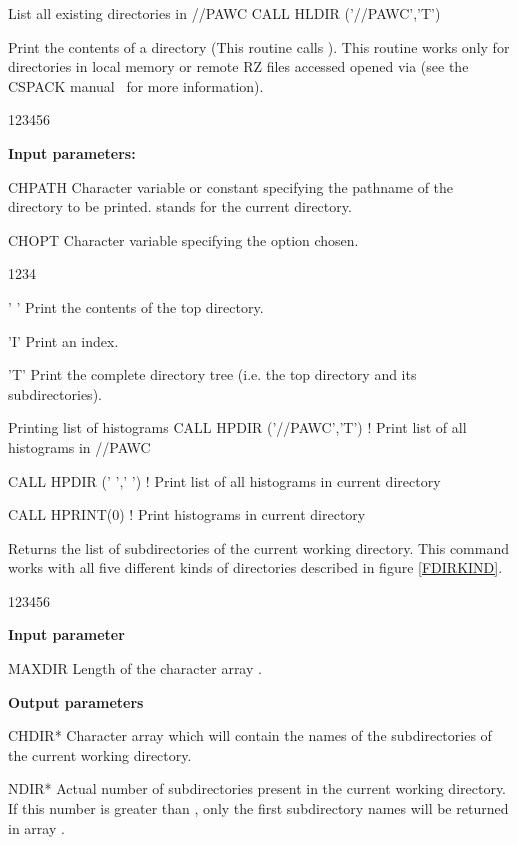 \begin{XMPt}{List all existing directories in //PAWC} 
CALL HLDIR ('//PAWC','T')
\end{XMPt}
 
\newpage%

 
\Action
Print the contents of a directory (This routine calls
).
This routine works only for directories in local memory
or remote RZ files accessed opened via  (see
the CSPACK manual~\cite{bib-CSPACK} for more information).
 
\begin{DLtt}{123456}
\item[{\rm\bf Input parameters:}]
\item[CHPATH] Character variable or constant
specifying the pathname of the directory to be printed.
 stands for the current directory.
\item[CHOPT] Character variable specifying the option chosen.
\begin{DLtt}{1234}
\item[' '] Print the contents of the top directory.
\item['I'] Print an index.
\item['T'] Print the complete directory tree (i.e. the top
directory and its subdirectories).
\end{DLtt}
\end{DLtt}
 
\begin{XMPt}{Printing list of histograms} 
CALL HPDIR ('//PAWC','T') ! Print list of all histograms in //PAWC

CALL HPDIR (' ',' ')      ! Print list of all histograms in current directory

CALL HPRINT(0)            ! Print histograms in current directory
\end{XMPt}

\newpage%
 
 
\Action
Returns the list of subdirectories of the current working directory.
This command works with all five different kinds of directories 
described in figure \ref{FDIRKIND}.
 
\begin{DLtt}{123456}
\item[{\rm\bf Input parameter}]
\item[MAXDIR] Length of the character array .
\item[{\rm\bf Output parameters}]
\item[CHDIR*] Character array which will contain the names
of the subdirectories of the current working directory.
\item[NDIR*]
Actual number of subdirectories present in the current working directory.
If this number is greater than , only the first
 subdirectory names will be returned in array .
\end{DLtt}
 
